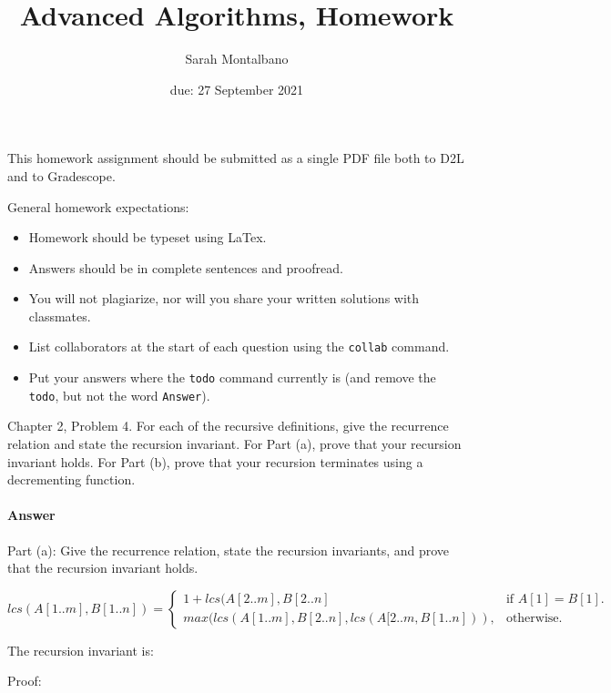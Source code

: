 \documentclass{article}
\title{Advanced Algorithms, Homework \hwnum}
\author{Sarah Montalbano}
\date{due: 27 September 2021}
\begin{document}
\maketitle

This homework assignment should be
submitted as a single PDF file both to D2L and to Gradescope.

General homework expectations:
\begin{itemize}
    \item Homework should be typeset using LaTex.
    \item Answers should be in complete sentences and proofread.
    \item You will not plagiarize, nor will you share your written solutions
        with classmates.
    \item List collaborators at the start of each question using the
        \texttt{collab} command.
    \item Put your answers where the \texttt{todo} command currently is (and
        remove the \texttt{todo}, but not the word \texttt{Answer}).
\end{itemize}




Chapter 2, Problem 4. For each of the recursive definitions, give the recurrence
relation and state the recursion invariant. For Part (a), prove that your
recursion invariant holds.  For Part (b), prove that your recursion terminates
using a decrementing function.

\paragraph{Answer}{Part (a): Give the recurrence relation, state the recursion invariants, and prove that the recursion invariant holds.

\begin{equation}
lcs(A[1..m], B[1..n]) = 
\begin{cases}
    1 + lcs(A[2..m], B[2..n] & \text{if $A[1] = B[1]$}.\\
    max(lcs(A[1..m], B[2..n], lcs(A[2..m, B[1..n])), & \text{otherwise}.
  \end{cases}
\end{equation}}

The recursion invariant is: 

Proof: 
\end{document}
